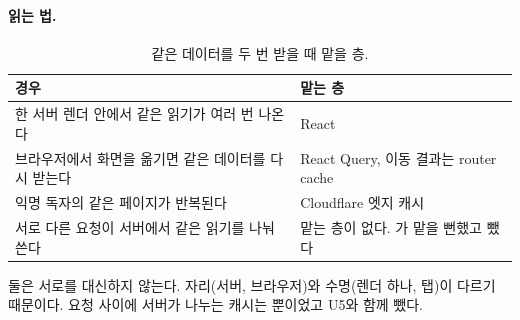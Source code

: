 \paragraph{읽는 법.}
\begin{table}[H]
  \caption{같은 데이터를 두 번 받을 때 맡을 층.}
  \label{tab:cc3-read}
  \centering\small
  \begin{tabularx}{\linewidth}{@{}L{5.0cm} Y@{}}
    \toprule
    경우 & 맡는 층 \\
    \midrule
    한 서버 렌더 안에서 같은 읽기가 여러 번 나온다 & React  \\
    \midrule
    브라우저에서 화면을 옮기면 같은 데이터를 다시 받는다 & React Query, 이동 결과는 router cache \\
    \midrule
    익명 독자의 같은 페이지가 반복된다 & Cloudflare 엣지 캐시 \\
    \midrule
    서로 다른 요청이 서버에서 같은 읽기를 나눠 쓴다 & 맡는 층이 없다. 가 맡을 뻔했고 뺐다 \\
    \bottomrule
  \end{tabularx}
\end{table}
둘은 서로를 대신하지 않는다. 자리(서버, 브라우저)와 수명(렌더 하나, 탭)이 다르기 때문이다.
요청 사이에 서버가 나누는 캐시는 뿐이었고 U5와 함께 뺐다.
